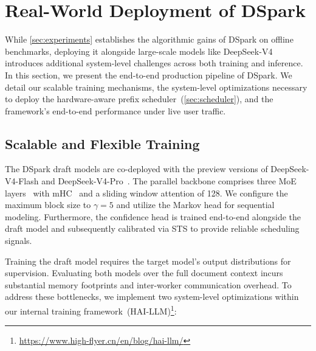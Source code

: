\section{Real-World Deployment of DSpark}   
\label{sec:real_world_deployment}  

While \autoref{sec:experiments} establishes the algorithmic gains of DSpark on offline benchmarks, deploying it alongside large-scale models like DeepSeek-V4~\citep{deepseekai2026deepseekv4highlyefficientmilliontoken} introduces additional system-level challenges across both training and inference. In this section, we present the end-to-end production pipeline of DSpark. We detail our scalable training mechanisms, the system-level optimizations necessary to deploy the hardware-aware prefix scheduler~(\autoref{sec:scheduler}), and the framework's end-to-end performance under live user traffic.

\subsection{Scalable and Flexible Training}   
\label{sec:prod_training}  
  
The DSpark draft models are co-deployed with the preview versions of DeepSeek-V4-Flash and DeepSeek-V4-Pro~\citep{deepseekai2026deepseekv4highlyefficientmilliontoken}. The parallel backbone comprises three MoE layers~\citep{dai2024deepseekmoe} with mHC~\citep{xie2025mhc} and a sliding window attention of 128. We configure the maximum block size to $\gamma=5$ and utilize the Markov head for sequential modeling. 
Furthermore, the confidence head is trained end-to-end alongside the draft model and subsequently calibrated via STS to provide reliable scheduling signals.
  
Training the draft model requires the target model's output distributions for supervision. Evaluating both models over the full document context incurs substantial memory footprints and inter-worker communication overhead. To address these bottlenecks, we implement two system-level optimizations within our internal training framework~(HAI-LLM)\footnote{\url{https://www.high-flyer.cn/en/blog/hai-llm/}}:

